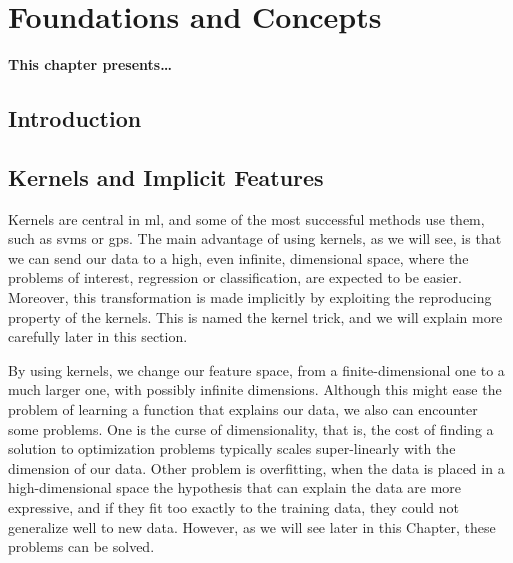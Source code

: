 
\chapter{Foundations and Concepts} %
\label{Chapter2}

{\bf \small{
This chapter presents\dots
}}


\section{Introduction}









\section{Kernels and Implicit Features}
Kernels are central in \acrshort{ml}, and some of the most successful methods use them, such as \acrshort{svms} or \acrshort{gps}.
The main advantage of using kernels, as we will see, is that we can send our data to a high, even infinite, dimensional space, where the problems of interest, regression or classification, are expected to be easier. Moreover, this transformation is made implicitly by exploiting the reproducing property of the kernels. This is named the kernel trick, and we will explain more carefully later in this section.

By using kernels, we change our feature space, from a finite-dimensional one to a much larger one, with possibly infinite dimensions. Although this might ease the problem of learning a function that explains our data, we also can encounter some problems. One is the curse of dimensionality, that is, the cost of finding a solution to optimization problems typically scales super-linearly with the dimension of our data. Other problem is overfitting, when the data is placed in a high-dimensional space the hypothesis that can explain the data are more expressive, and if they fit too exactly to the training data, they could not generalize well to new data. However, as we will see later in this Chapter, these problems can be solved.


